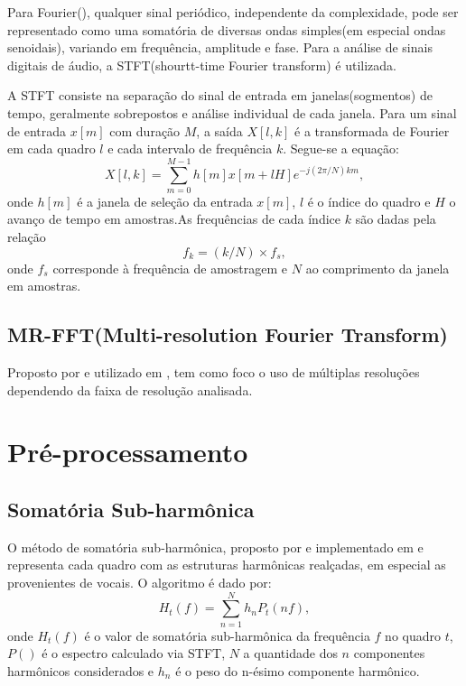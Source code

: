 \documentclass[
	12pt,				%
	openright,			%
	oneside,			%
	a4paper,			%
	english,			%
	brazil,				%
	]{abntex2}
\begin{document}
Para Fourier(), qualquer sinal periódico, independente da complexidade, pode ser representado como uma somatória de diversas ondas simples(em especial ondas senoidais), variando em frequência, amplitude e fase. Para a análise de sinais digitais de áudio, a STFT(shourtt-time Fourier transform) é utilizada.

A STFT consiste na separação do sinal de entrada em janelas(sogmentos) de tempo, geralmente sobrepostos e análise individual de cada janela. Para um sinal de entrada $x[m]$ com duração $M$, a saída $X[l, k]$ é a transformada de Fourier em cada quadro $l$ e cada intervalo de frequência $k$. Segue-se a equação:
\begin{equation}
    X[l, k] = \displaystyle\sum_{m = 0}^{M-1}h[m]x[m + lH]e^{-j(2\pi/N)km}, 
\end{equation}
onde $h[m]$ é a janela de seleção da entrada $x[m]$, $l$ é o índice do quadro e $H$ o avanço de tempo em amostras.As frequências de cada índice $k$ são dadas pela relação
\begin{equation}
    f_k = (k/N) \times f_s, 
\end{equation}
onde $f_s$ corresponde à frequência de amostragem e $N$ ao comprimento da janela em amostras.

\subsection{MR-FFT(Multi-resolution Fourier Transform)}
Proposto por  e utilizado em , tem como foco o uso de múltiplas resoluções dependendo da faixa de resolução analisada.%

\section{Pré-processamento}
\subsection{Somatória Sub-harmônica}
O método de somatória sub-harmônica, proposto por  e implementado em  e  representa cada quadro com as estruturas harmônicas realçadas, em especial as provenientes de vocais. O algoritmo é dado por:
\begin{equation}
    H_t(f) = \displaystyle\sum_{n = 1}^N h_n P_t(nf), 
\end{equation}
onde $H_t (f)$ é o valor de somatória sub-harmônica da frequência $f$ no quadro $t$, $P()$ é o espectro calculado via STFT, $N$ a quantidade dos $n$ componentes harmônicos considerados e $h_n$ é o peso do n-ésimo componente harmônico.
\end{document}
